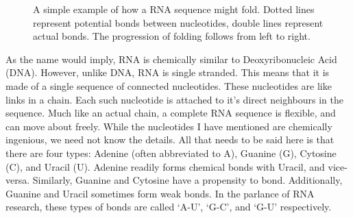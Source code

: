 \documentclass[12pt, a4paper]{article}
\begin{document}
\begin{figure}
\begin{center}
\end{center}
\caption{A simple example of how a RNA sequence might fold. Dotted lines represent potential bonds between nucleotides, double lines represent actual bonds. The progression of folding follows from left to right.}
\label{fig:RNAssBasic}
\end{figure}


As the name would imply, RNA is chemically similar to Deoxyribonucleic Acid (DNA). However, unlike DNA, RNA is single stranded. This means that it is made of a single sequence of connected nucleotides. These nucleotides are like links in a chain. Each such nucleotide is attached to it's direct neighbours in the sequence. Much like an actual chain, a complete RNA sequence is flexible, and can move about freely. While the nucleotides I have mentioned are chemically ingenious, we need not know the details. All that needs to be said here is that there are four types: Adenine (often abbreviated to A), Guanine (G), Cytosine (C), and Uracil (U). Adenine readily forms chemical bonds with Uracil, and vice-versa. Similarly, Guanine and Cytosine have a propensity to bond. Additionally, Guanine and Uracil sometimes form weak bonds. In the parlance of RNA research, these types of bonds are called `A-U', `G-C', and `G-U' respectively.
\end{document}
